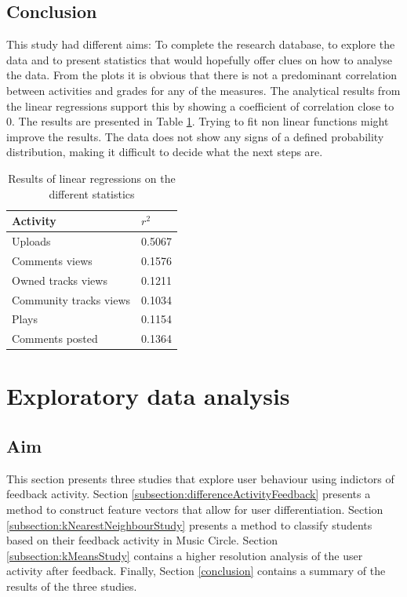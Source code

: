 \documentclass[11pt, oneside]{article}   	%
\begin{document}
\subsection{Conclusion}
This study had different aims: To complete the research database, to explore the data and to present statistics that would hopefully offer clues on how to analyse the data. From the plots it is obvious that there is not a predominant correlation between activities and grades for any of the measures. The analytical results from the linear regressions support this by showing a coefficient of correlation close to 0. The results are presented in Table \ref{table:initialStudyResults}. Trying to fit non linear functions might improve the results. The data does not show any signs of a defined probability distribution, making it difficult to decide what the next steps are. 
\begin{table}[h]
	\centering
	\begin{tabular}{| l | l |}
		\hline
		 \textbf{Activity} & \textbf{$r^2$} \\ \hline
		 Uploads & 0.5067 \\ \hline
		 Comments views & 0.1576 \\ \hline
		 Owned tracks views & 0.1211 \\ \hline
		 Community tracks views & 0.1034 \\ \hline
		 Plays & 0.1154 \\ \hline
		 Comments posted & 0.1364 \\ \hline
	\end{tabular}
	\caption{Results of linear regressions on the different statistics}
	\label{table:initialStudyResults}
\end{table}
\newpage

\section{Exploratory data analysis}
\label{section:exploratoryDataAnalysis}
\subsection{Aim}
This section presents three studies that explore user behaviour using indictors of feedback activity. Section \ref{subsection:differenceActivityFeedback} presents a method to construct feature vectors that allow for user differentiation. Section \ref{subsection:kNearestNeighbourStudy} presents a method to classify students based on their feedback activity in Music Circle. Section \ref{subsection:kMeansStudy} contains a higher resolution analysis of the user activity after feedback. Finally, Section \ref{conclusion} contains a summary of the results of the three studies.
\end{document}
